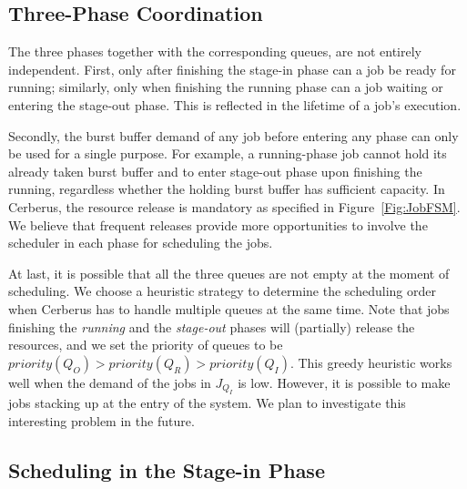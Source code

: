 \subsection{Three-Phase Coordination}
The three phases together with the corresponding queues, are not entirely independent.
First, only after finishing the stage-in phase can a job be ready for running;
similarly, only when finishing the running phase can a job waiting or entering the stage-out phase.
This is reflected in the lifetime of a job's execution.

Secondly,  the burst buffer demand of any job before entering any phase can only be used for a single purpose.
For example, a running-phase job cannot hold its already taken burst buffer
and to enter stage-out phase upon finishing the running, regardless whether the holding burst buffer has sufficient capacity.
In Cerberus, the resource release is mandatory as specified in Figure~\ref{Fig:JobFSM}.
We believe that frequent releases provide more opportunities to involve the scheduler in each phase for scheduling the jobs.

At last, it is possible that all the three queues are not empty at the moment of scheduling.
We choose a heuristic strategy to determine the scheduling order when
Cerberus has to handle multiple queues at the same time.
Note that jobs finishing the \textit{running} and the \textit{stage-out} phases
will (partially) release the resources, and we set the priority of queues to be $priority(Q_O) > priority(Q_R) > priority(Q_I)$.
This greedy heuristic works well when the demand of the jobs in $J_{Q_I}$ is low.
However, it is possible to make jobs stacking up at the entry of the system.
We plan to investigate this interesting problem in the future.



\subsection{Scheduling in the Stage-in Phase}

